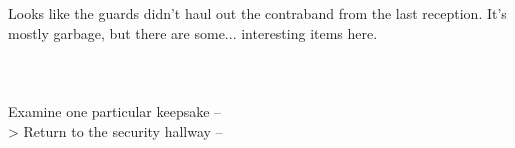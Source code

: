 Looks like the guards didn’t haul out the contraband from the last reception. It’s mostly garbage, but there are some... interesting items here.\\
\\
\\
\\

 Examine one particular keepsake -- \\
> Return to the security hallway -- 